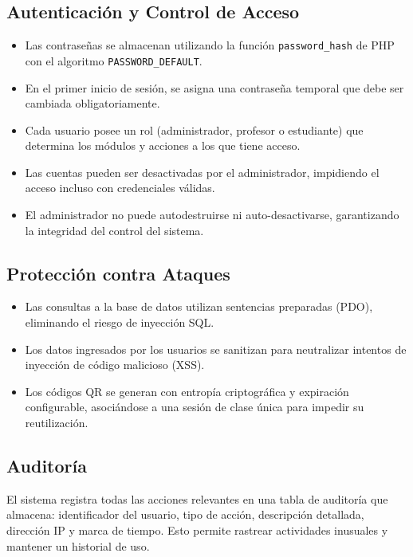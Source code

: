 \documentclass[12pt, letterpaper, oneside]{report}
\begin{document}
\subsection{Autenticaci\'on y Control de Acceso}

\begin{itemize}
  \item Las contrase\~nas se almacenan utilizando la funci\'on \texttt{password\_hash} de PHP con el algoritmo \texttt{PASSWORD\_DEFAULT}.
  \item En el primer inicio de sesi\'on, se asigna una contrase\~na temporal que debe ser cambiada obligatoriamente.
  \item Cada usuario posee un rol (administrador, profesor o estudiante) que determina los m\'odulos y acciones a los que tiene acceso.
  \item Las cuentas pueden ser desactivadas por el administrador, impidiendo el acceso incluso con credenciales v\'alidas.
  \item El administrador no puede autodestruirse ni auto-desactivarse, garantizando la integridad del control del sistema.
\end{itemize}

\subsection{Protecci\'on contra Ataques}

\begin{itemize}
  \item Las consultas a la base de datos utilizan sentencias preparadas (PDO), eliminando el riesgo de inyecci\'on SQL.
  \item Los datos ingresados por los usuarios se sanitizan para neutralizar intentos de inyecci\'on de c\'odigo malicioso (XSS).
  \item Los c\'odigos QR se generan con entrop\'ia criptogr\'afica y expiraci\'on configurable, asoci\'andose a una sesi\'on de clase \'unica para impedir su reutilizaci\'on.
\end{itemize}

\subsection{Auditor\'ia}

El sistema registra todas las acciones relevantes en una tabla de auditor\'ia que almacena: identificador del usuario, tipo de acci\'on, descripci\'on detallada, direcci\'on IP y marca de tiempo. Esto permite rastrear actividades inusuales y mantener un historial de uso.
\end{document}
